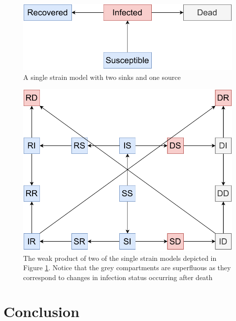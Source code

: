\documentclass{article}
\theoremstyle{definition}
\begin{document}
\begin{figure}
    \centering
    \includegraphics[width=\textwidth]{images_pdf/SIR_w_Death.pdf}
    \caption{A single strain model with two sinks and one source}
    \label{fig:msms}
\end{figure}

\begin{figure}
    \centering
    \includegraphics[width=\textwidth]{images_pdf/Two_strain_SIR_w_Death.pdf}
    \caption{The weak product of two of the single strain models depicted in Figure \ref{fig:msms}. Notice that the grey compartments are superfluous as they correspond to changes in infection status occurring after death}
    \label{fig:msms2}
\end{figure}


\FloatBarrier
\section{Conclusion}\label{conc}
\end{document}

